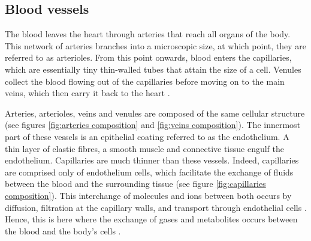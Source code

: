 \subsection{Blood vessels}
The blood leaves the heart through arteries that reach all organs of the body. This network of arteries branches into a microscopic size, at which point, they are referred to as arterioles. From this point onwards, blood enters the capillaries, which are essentially tiny thin-walled tubes that attain the size of a cell. Venules collect the blood flowing out of the capillaries before moving on to the main veins, which then carry it back to the heart \cite{Hall:2015aa}.

Arteries, arterioles, veins and venules are composed of the same cellular structure (see figures \ref{fig:arteries composition} and \ref{fig:veins composition}). The innermost part of these vessels is an epithelial coating referred to as the endothelium. A thin layer of elastic fibres, a smooth muscle and connective tissue engulf the endothelium. Capillaries are much thinner than these vessels. Indeed, capillaries are comprised only of endothelium cells, which facilitate the exchange of fluids between the blood and the surrounding tissue (see figure \ref{fig:capillaries composition}). This interchange of molecules and ions between both occurs by diffusion, filtration at the capillary walls, and transport through endothelial cells \cite{Hall:2015aa}. Hence, this is here where the exchange of gases and metabolites occurs between the blood and the body's cells \cite{johnson2001biology}.


